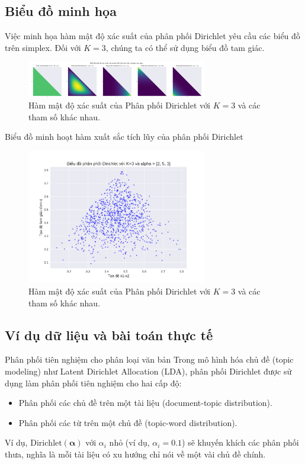 	\subsection{Biểu đồ minh họa}
	Việc minh họa hàm mật độ xác suất của phân phối Dirichlet yêu cầu các biểu đồ trên simplex. Đối với $K=3$, chúng ta có thể sử dụng biểu đồ tam giác.
	
	\begin{figure}[h!]
		\centering
		\includegraphics[width=0.7\textwidth]{images/Dirichlet Distribution-PDF.png} %
		\caption{Hàm mật độ xác suất của Phân phối Dirichlet với $K=3$ và các tham số khác nhau.}
		\label{fig:pngDirichlet Distribution-PDF}
	\end{figure}
	
	Biểu đồ minh hoạt hàm xuất sắc tích lũy của phân phối Dirichlet
	
	\begin{figure}[h!]
		\centering
		\includegraphics[width=0.7\textwidth]{images/Dirichlet Distribution-CDF.png} %
		\caption{Hàm mật độ xác suất của Phân phối Dirichlet với $K=3$ và các tham số khác nhau.}
		\label{fig:pngDirichlet Distribution-CDF}
	\end{figure}
	
	\subsection{Ví dụ dữ liệu và bài toán thực tế}
		Phân phối tiên nghiệm cho phân loại văn bản
		Trong mô hình hóa chủ đề (topic modeling) như Latent Dirichlet Allocation (LDA), phân phối Dirichlet được sử dụng làm phân phối tiên nghiệm cho hai cấp độ:
		\begin{itemize}
			\item Phân phối các chủ đề trên một tài liệu (document-topic distribution).
			\item Phân phối các từ trên một chủ đề (topic-word distribution).
		\end{itemize}
		Ví dụ, $\text{Dirichlet}(\boldsymbol{\alpha})$ với $\alpha_i$ nhỏ (ví dụ, $\alpha_i=0.1$) sẽ khuyến khích các phân phối thưa, nghĩa là mỗi tài liệu có xu hướng chỉ nói về một vài chủ đề chính.
	
